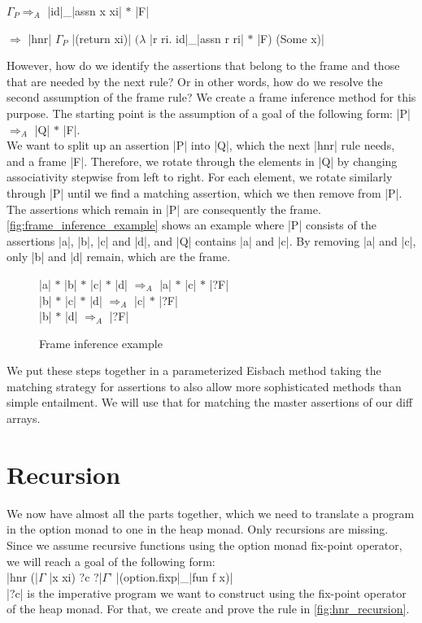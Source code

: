 \begin{samepage}
\noindent $\Gamma_P \Longrightarrow_A$ |id|\_|assn x xi| $*$ |F|

\nopagebreak
\noindent $\Longrightarrow$ |hnr| $\Gamma_P$ |(return xi)| $(\lambda$ |r ri. id|\_|assn r ri| $*$ |F) (Some x)|
\end{samepage}

\noindent However, how do we identify the assertions that belong to the frame and those that are needed by the next rule? Or in other words, how do we resolve the second assumption of the frame rule?
We create a frame inference method for this purpose. The starting point is the assumption of a goal of the following form: |P| $\Longrightarrow_A$ |Q| $*$ |F|.\\
We want to split up an assertion |P| into |Q|, which the next |hnr| rule needs, and a frame |F|. Therefore, we rotate through the elements in |Q| by changing associativity stepwise from left to right. For each element, we rotate similarly through |P| until we find a matching assertion, which we then remove from |P|. The assertions which remain in |P| are consequently the frame.\\
\autoref{fig:frame_inference_example} shows an example where |P| consists of the assertions |a|, |b|, |c| and |d|, and |Q| contains |a| and |c|. By removing |a| and |c|, only |b| and |d| remain, which are the frame.

\begin{figure}[htpb]
    \centering
    |a| $*$ |b| $*$ |c| $*$ |d| $\Longrightarrow_A$ |a| $*$ |c| $*$ |?F| \\
            |b| $*$ |c| $*$ |d| $\Longrightarrow_A$ |c| $*$ |?F| \\
                    |b| $*$ |d| $\Longrightarrow_A$ |?F|
    \caption[Frame inference example]{Frame inference example}
    \label{fig:frame_inference_example}
\end{figure}

\noindent We put these steps together in a parameterized Eisbach method taking the matching strategy for assertions to also allow more sophisticated methods than simple entailment. We will use that for matching the master assertions of our diff arrays.

\section{Recursion}

We now have almost all the parts together, which we need to translate a program in the option monad to one in the heap monad. Only recursions are missing. Since we assume recursive functions using the option monad fix-point operator, we will reach a goal of the following form:\\
|hnr (|$\Gamma$ |x xi) ?c ?|$\Gamma$' |(option.fixp|\_|fun f x)|\\
|?c| is the imperative program we want to construct using the fix-point operator of the heap monad. For that, we create and prove the rule in \autoref{fig:hnr_recursion}.

